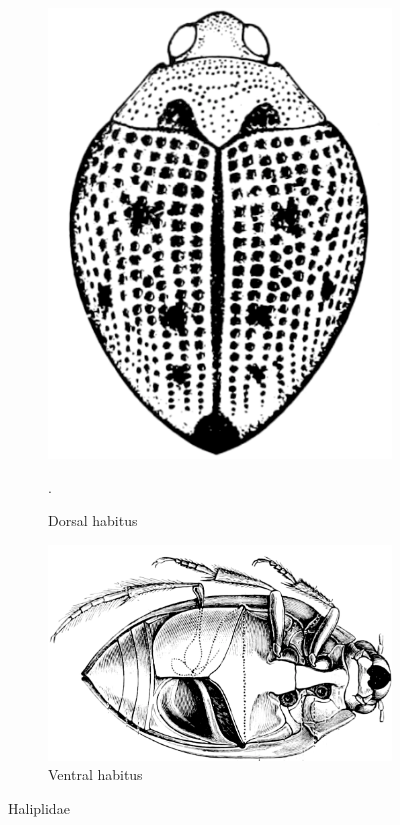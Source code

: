 \documentclass[letterpaper, 11pt]{article}
\begin{document}
\begin{figure}[ht!]
  \centering
\begin{subfigure}[ht!]{0.2\textwidth}
   \includegraphics[width=\textwidth]{HaliplidHabitus.png}
  \caption{Dorsal habitus \citep[][Fig. 13:4a]{bhlitem126080aquatic}}.
  \label{fig:halipliddors}
\end{subfigure}
    \qquad
\begin{subfigure}[ht!]{0.45\textwidth}
\includegraphics[width=\textwidth]{HaliplidHabitus2.png}
  \caption{
  Ventral habitus \citep[][Fig. 34]{bhlitem36600}}
  \label{fig:haliplididvent}
\end{subfigure}
    \caption{Haliplidae}
\end{figure}
\end{document}
